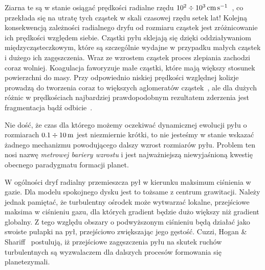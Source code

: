 Ziarna te są w stanie osiągać prędkości radialne rzędu
$10^2\div10^3\hbox{$\thinspace\textrm{cm}$}\hbox{$\thinspace\textrm{s}$}^{-1}$~\cite{weidenschilling-77}, co przekłada się na utratę
tych cząstek w skali czasowej rzędu setek lat!  Kolejną konsekwencją zależności
radialnego dryfu od rozmiaru cząstek jest zróżnicowanie ich prędkości względem
siebie. Cząstki pyłu sklejają się dzięki oddziaływaniom międzycząsteczkowym,
które są szczególnie wydajne w przypadku małych cząstek i dużego ich
zagęszczenia. Wraz ze wzrostem cząstek proces zlepiania zachodzi coraz wolniej.
Koagulacja faworyzuje małe cząstki, które mają większy stosunek powierzchni do
masy. Przy odpowiednio niskiej prędkości względnej kolizje prowadzą do tworzenia
coraz to większych aglomeratów cząstek~\citep{BW08}, ale dla dużych różnic w
prędkościach najbardziej prawdopodobnym rezultatem zderzenia jest
fragmentacja bądź odbicie~\citep{Z10}. 
\par Nie dość, że czas dla którego możemy oczekiwać dynamicznej ewolucji pyłu o
rozmiarach $0.1 \div 10\hbox{$\thinspace\textrm{m}$}$ jest niezmiernie krótki, to nie jesteśmy w stanie
wskazać żadnego mechanizmu powodującego dalszy wzrost rozmiarów pyłu. Problem
ten nosi nazwę \emph{metrowej bariery wzrostu} i jest najważniejszą
niewyjaśnioną kwestię obecnego paradygmatu formacji planet.
\par W ogólności dryf radialny przemieszcza pył w kierunku maksimum ciśnienia w
gazie. Dla modelu spokojnego dysku jest to tożsame z centrum grawitacji. Należy
jednak pamiętać, że turbulentny ośrodek może wytwarzać lokalne, przejściowe
maksima w ciśnieniu gazu, dla których gradient będzie dużo większy niż gradient
globalny. Z tego względu obszary o podwyższonym ciśnieniu będą działać jako
swoiste pułapki na pył, przejściowo zwiększając jego gęstość. 
Cuzzi, Hogan \& Shariff~\citep{CHS08} postulują, iż przejściowe zagęszczenia
pyłu na skutek ruchów turbulentnych są wyzwalaczem dla dalszych procesów
formowania się planetezymali.
